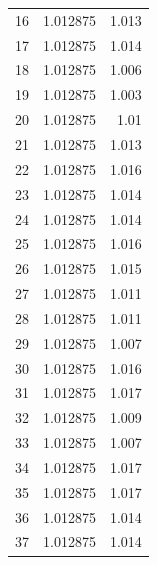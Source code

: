 \begin{table}[H]
\begin{tabular}{l c r}
		16              & 1.012875                         & 1.013                              \\
		17              & 1.012875                         & 1.014                              \\
		18              & 1.012875                         & 1.006                              \\
		19              & 1.012875                         & 1.003                              \\
		20              & 1.012875                         & 1.01                               \\
		21              & 1.012875                         & 1.013                              \\
		22              & 1.012875                         & 1.016                              \\
		23              & 1.012875                         & 1.014                              \\
		24              & 1.012875                         & 1.014                              \\
		25              & 1.012875                         & 1.016                              \\
		26              & 1.012875                         & 1.015                              \\
		27              & 1.012875                         & 1.011                              \\
		28              & 1.012875                         & 1.011                              \\
		29              & 1.012875                         & 1.007                              \\
		30              & 1.012875                         & 1.016                              \\
		31              & 1.012875                         & 1.017                              \\
		32              & 1.012875                         & 1.009                              \\
		33              & 1.012875                         & 1.007                              \\
		34              & 1.012875                         & 1.017                              \\
		35              & 1.012875                         & 1.017                              \\
		36              & 1.012875                         & 1.014                              \\
		37              & 1.012875                         & 1.014                              \\ \bottomrule
	\end{tabular}
\end{table}

